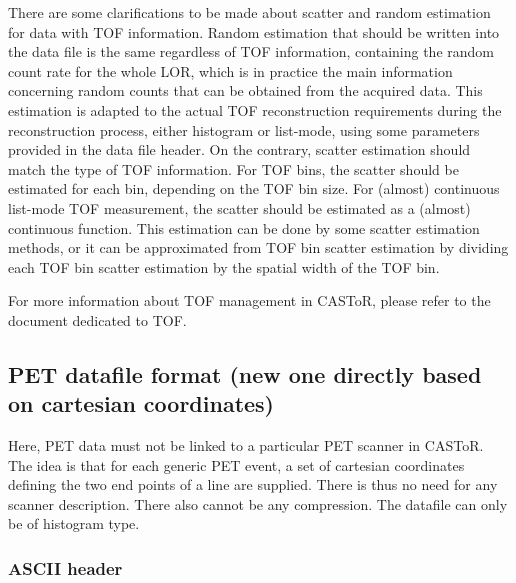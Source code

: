 \documentclass[a4paper, 11pt]{article}
\begin{document}
There are some clarifications to be made about scatter and random estimation for data with TOF information. Random estimation that should be written into the data file is the same regardless of TOF information, containing the random count rate for the whole LOR, which is in practice the main information concerning random counts that can be obtained from the acquired data. This estimation is adapted to the actual TOF reconstruction requirements during the reconstruction process, either histogram or list-mode, using some parameters provided in the data file header. On the contrary, scatter estimation should match the type of TOF information. For TOF bins, the scatter should be estimated for each bin, depending on the TOF bin size. For (almost) continuous list-mode TOF measurement, the scatter should be estimated as a (almost) continuous function. This estimation can be done by some scatter estimation methods, or it can be approximated from TOF bin scatter estimation by dividing each TOF bin scatter estimation by the spatial width of the TOF bin.

For more information about TOF management in CASToR, please refer to the document dedicated to TOF.

\subsection{PET datafile format (new one directly based on cartesian coordinates)}
\label{ss_input_PET_cart}

Here, PET data must not be linked to a particular PET scanner in CASToR.
The idea is that for each generic PET event, a set of cartesian coordinates defining the two end points of a line are supplied.
There is thus no need for any scanner description.
There also cannot be any compression.
The datafile can only be of histogram type.

\subsubsection{ASCII header}
\end{document}
